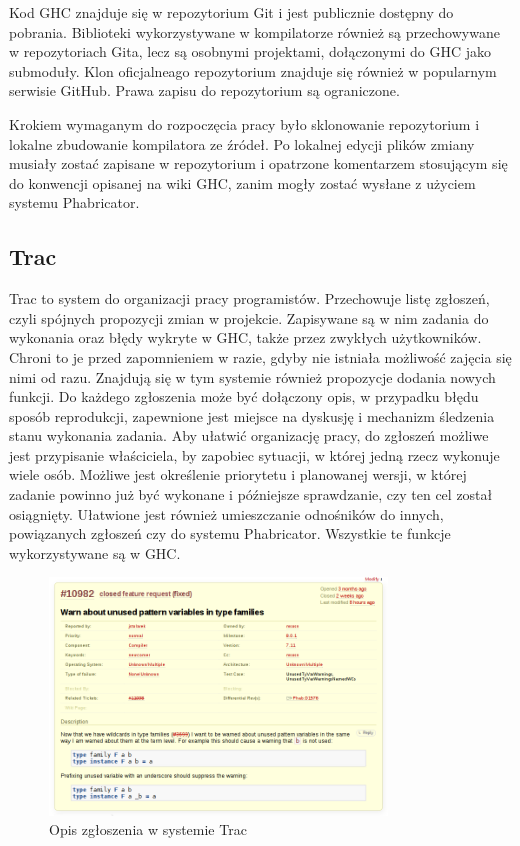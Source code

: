 Kod GHC znajduje się w repozytorium Git i jest publicznie dostępny do
pobrania.
Biblioteki wykorzystywane w kompilatorze również są przechowywane w
repozytoriach Gita, lecz są osobnymi projektami, dołączonymi do GHC jako
submoduły. Klon oficjalneago repozytorium znajduje się również w popularnym
serwisie GitHub. Prawa zapisu do repozytorium są
ograniczone\cite{WikiGettingTheSources}.

Krokiem wymaganym do rozpoczęcia pracy było sklonowanie repozytorium i lokalne
zbudowanie kompilatora ze źródeł. Po lokalnej edycji plików zmiany musiały
zostać zapisane w repozytorium i opatrzone komentarzem stosującym się do
konwencji opisanej na wiki GHC, zanim mogły zostać wysłane z użyciem systemu
Phabricator.

\subsection{Trac}

Trac to system do organizacji pracy programistów. Przechowuje listę zgłoszeń,
czyli spójnych propozycji zmian w projekcie. Zapisywane są w nim zadania do
wykonania oraz błędy wykryte w GHC, także przez zwykłych użytkowników. Chroni to
je przed zapomnieniem w razie, gdyby nie istniała możliwość zajęcia się nimi od
razu. Znajdują się w tym systemie również propozycje dodania nowych funkcji. Do
każdego zgłoszenia może być dołączony opis, w przypadku błędu sposób
reprodukcji, zapewnione jest miejsce na dyskusję i mechanizm śledzenia stanu
wykonania zadania. Aby ułatwić organizację pracy, do zgłoszeń możliwe jest
przypisanie właściciela, by zapobiec sytuacji, w której jedną rzecz wykonuje
wiele osób. Możliwe jest określenie priorytetu i planowanej wersji, w której
zadanie powinno już być wykonane i późniejsze sprawdzanie, czy ten cel został
osiągnięty. Ułatwione jest również umieszczanie odnośników do innych,
powiązanych zgłoszeń czy do systemu Phabricator. Wszystkie te funkcje
wykorzystywane są w GHC.

\begin{figure}[ht]
    \centering
    \includegraphics[width=0.8\textwidth]{images/Trac_description}
    \caption{Opis zgłoszenia w systemie Trac}
    \label{fig:Trac_description}
\end{figure}


